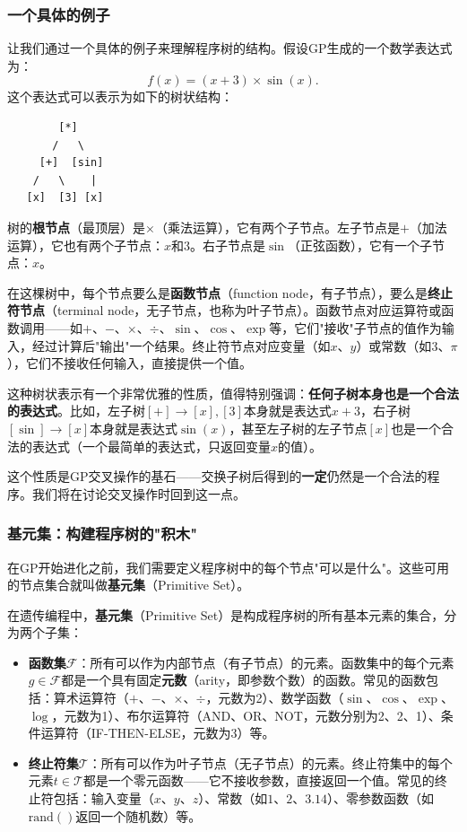 \documentclass[lang=cn,zihao=-4,a4paper,fontset=windows]{beautybook}
\begin{document}
\subsubsection{一个具体的例子}

让我们通过一个具体的例子来理解程序树的结构。假设GP生成的一个数学表达式为：
\[
f(x) = (x + 3) \times \sin(x).
\]
这个表达式可以表示为如下的树状结构：

\begin{verbatim}
        [*]
       /   \
     [+]  [sin]
    /   \    |
   [x]  [3] [x]
\end{verbatim}

树的\textbf{根节点}（最顶层）是$\times$（乘法运算），它有两个子节点。左子节点是$+$（加法运算），它也有两个子节点：$x$和$3$。右子节点是$\sin$（正弦函数），它有一个子节点：$x$。

在这棵树中，每个节点要么是\textbf{函数节点}（function node，有子节点），要么是\textbf{终止符节点}（terminal node，无子节点，也称为叶子节点）。函数节点对应运算符或函数调用——如$+$、$-$、$\times$、$\div$、$\sin$、$\cos$、$\exp$等，它们"接收"子节点的值作为输入，经过计算后"输出"一个结果。终止符节点对应变量（如$x$、$y$）或常数（如$3$、$\pi$），它们不接收任何输入，直接提供一个值。

这种树状表示有一个非常优雅的性质，值得特别强调：\textbf{任何子树本身也是一个合法的表达式}。比如，左子树$[+] \to [x], [3]$本身就是表达式$x + 3$，右子树$[\sin] \to [x]$本身就是表达式$\sin(x)$，甚至左子树的左子节点$[x]$也是一个合法的表达式（一个最简单的表达式，只返回变量$x$的值）。

这个性质是GP交叉操作的基石——交换子树后得到的\textbf{一定}仍然是一个合法的程序。我们将在讨论交叉操作时回到这一点。

\subsubsection{基元集：构建程序树的"积木"}

在GP开始进化之前，我们需要定义程序树中的每个节点"可以是什么"。这些可用的节点集合就叫做\textbf{基元集}（Primitive Set）。

\begin{definition}[][基元集]
在遗传编程中，\textbf{基元集}（Primitive Set）是构成程序树的所有基本元素的集合，分为两个子集：
\begin{itemize}
    \item \textbf{函数集}$\mathcal{F}$：所有可以作为内部节点（有子节点）的元素。函数集中的每个元素$g \in \mathcal{F}$都是一个具有固定\textbf{元数}（arity，即参数个数）的函数。常见的函数包括：算术运算符（$+$、$-$、$\times$、$\div$，元数为2）、数学函数（$\sin$、$\cos$、$\exp$、$\log$，元数为1）、布尔运算符（AND、OR、NOT，元数分别为2、2、1）、条件运算符（IF-THEN-ELSE，元数为3）等。
    \item \textbf{终止符集}$\mathcal{T}$：所有可以作为叶子节点（无子节点）的元素。终止符集中的每个元素$t \in \mathcal{T}$都是一个零元函数——它不接收参数，直接返回一个值。常见的终止符包括：输入变量（$x$、$y$、$z$）、常数（如$1$、$2$、$3.14$）、零参数函数（如$\text{rand}()$返回一个随机数）等。
\end{itemize}
\end{definition}
\end{document}
